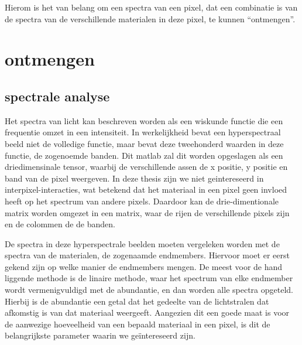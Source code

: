 \documentclass[12pt]{report}
\begin{document}
Hierom is het van belang om een spectra van een pixel, dat een combinatie is van de spectra van de verschillende materialen in deze pixel, te kunnen ``ontmengen''.


\chapter{ontmengen}



\section{spectrale analyse}


Het spectra van licht kan beschreven worden als een wiskunde functie die een frequentie omzet in een intensiteit. In werkelijkheid bevat een hyperspectraal beeld niet de volledige functie, maar bevat deze tweehonderd waarden in deze functie, de zogenoemde banden. Dit matlab\citep{MATLAB} zal dit worden opgeslagen als een driedimensinale tensor, waarbij de verschillende assen de x positie, y positie en band van de pixel weergeven. In deze thesis zijn we niet geintereseerd in  interpixel-interacties, wat betekend dat het materiaal in een pixel geen invloed heeft op het spectrum van andere pixels. Daardoor kan de drie-dimentionale matrix worden omgezet in een matrix, waar de rijen de verschillende pixels zijn en de colommen de de banden.  

De spectra in deze hyperspectrale beelden moeten vergeleken worden met de spectra van de materialen, de zogenaamde endmembers. Hiervoor moet er eerst gekend zijn op welke manier de endmembers mengen. De meest voor de hand liggende methode is de linaire methode, waar het spectrum van elke endmember wordt vermenigvuldigd met de abundantie, en dan worden alle spectra opgeteld. Hierbij is de abundantie een getal dat het gedeelte van de lichtstralen dat afkomstig is van dat materiaal weergeeft. Aangezien dit een goede maat is voor de aanwezige hoeveelheid van een bepaald materiaal in een pixel, is dit de belangrijkste parameter waarin we ge\"intereseerd zijn.

\end{document}
